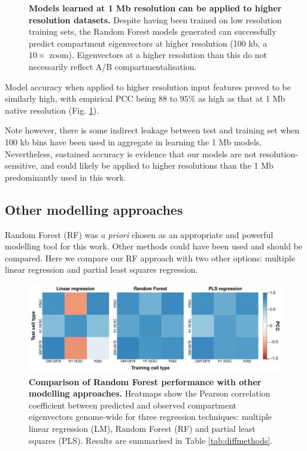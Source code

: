 \documentclass[a4paper,11pt,oneside]{book}
\begin{document}
\begin{figure}
\begin{center}
\captionsetup{width=\textwidth} 
\caption{ {\bf Models learned at 1 Mb resolution can be applied to higher resolution datasets. }
Despite having been trained on low resolution training sets, the Random Forest models generated can successfully predict compartment eigenvectors at higher resolution (100 kb, a $10\times$ zoom). Eigenvectors at a higher resolution than this do not necessarily reflect A/B compartmentalisation.
}\label{fig:100kb}
\end{center} 
\end{figure} 

Model accuracy when applied to higher resolution input features proved to be similarly high, with empirical PCC being $88$ to $95\%$ as high as that at 1 Mb native resolution (Fig. \ref{fig:100kb}).

Note however, there is some indirect leakage between test and training set when 100 kb bins have been used in aggregate in learning the 1 Mb models. Nevertheless, sustained accuracy is evidence that our models are not resolution-sensitive, and could likely be applied to higher resolutions than the 1 Mb predominantly used in this work.

\subsection{Other modelling approaches}

Random Forest (RF) was \emph{a priori} chosen as an appropriate and powerful modelling tool for this work. Other methods could have been used and should be compared. Here we compare our RF approach with two other options: multiple linear regression and partial least squares regression.

\begin{figure}
\begin{center} 
\includegraphics[width=1.2\textwidth]{figs/diffmethods.pdf}
\captionsetup{width=1.2\textwidth} 
\caption{ {\bf Comparison of Random Forest performance with other modelling approaches. }
Heatmaps show the Pearson correlation coefficient between predicted and observed compartment eigenvectors genome-wide for three regression techniques: multiple linear regression (LM), Random Forest (RF) and partial least squares (PLS). Results are summarised in Table \ref{tab:diffmethods}.
}\label{fig:diffmethods}
\end{center} 
\end{figure} 
\end{document}

